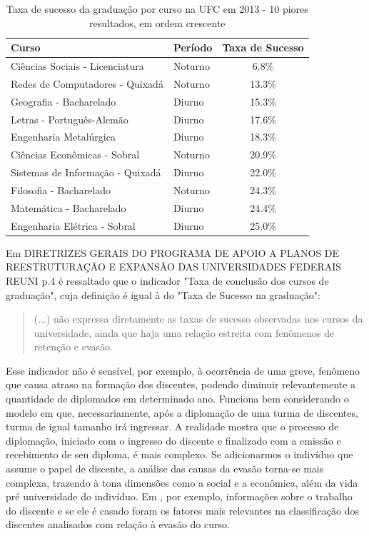 \begin{table}[H]
\begin{tabular}{llc}
\toprule
                            Curso &  Período & Taxa de Sucesso \\
\midrule
  Ciências Sociais - Licenciatura &  Noturno &            6.8\% \\
  Redes de Computadores - Quixadá &  Noturno &           13.3\% \\
          Geografia - Bacharelado &   Diurno &           15.3\% \\
        Letras - Português-Alemão &   Diurno &           17.6\% \\
           Engenharia Metalúrgica &   Diurno &           18.3\% \\
     Ciências Econômicas - Sobral &  Noturno &           20.9\% \\
 Sistemas de Informação - Quixadá &   Diurno &           22.0\% \\
          Filosofia - Bacharelado &  Noturno &           24.3\% \\
         Matemática - Bacharelado &   Diurno &           24.4\% \\
     Engenharia Elétrica - Sobral &   Diurno &           25.0\% \\
\bottomrule
\end{tabular}
\caption{Taxa de sucesso da graduação por curso na UFC em 2013 - 10 piores resultados, em ordem crescente}
\label{table:ts_2013}
\end{table}

Em DIRETRIZES GERAIS DO PROGRAMA DE APOIO A PLANOS DE REESTRUTURAÇÃO E EXPANSÃO DAS UNIVERSIDADES FEDERAIS REUNI p.4 é ressaltado que o indicador "Taxa de conclusão dos cursos de graduação", cuja definição é igual à do "Taxa de Sucesso na graduação":

\begin{quote}
(...) não expressa diretamente as taxas de sucesso observadas nos cursos da universidade, ainda que haja uma relação estreita com fenômenos de retenção e evasão.
\end{quote}

Esse indicador não é sensível, por exemplo, à ocorrência de uma greve, fenômeno que causa atraso na formação dos discentes, podendo diminuir relevantemente a quantidade de diplomados em determinado ano. Funciona bem considerando o modelo em que, necessariamente, após a diplomação de uma turma de discentes, turma de igual tamanho irá ingressar. A realidade mostra que o processo de diplomação, iniciado com o ingresso do discente e finalizado com a emissão e recebimento de seu diploma, é mais complexo. Se adicionarmos o indivíduo que assume o papel de discente, a análise das causas da evasão torna-se mais complexa, trazendo à tona dimensões como a social e a econômica, além da vida pré universidade do indivíduo. Em \cite{unioeste}, por exemplo, informações sobre o trabalho do discente e se ele é casado foram os fatores mais relevantes na classificação dos discentes analisados com relação à evasão do curso. 

